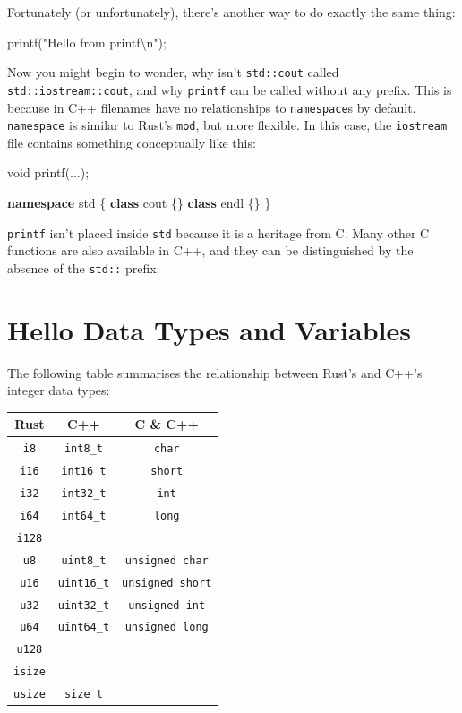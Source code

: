 \documentclass[
]{book}
\newenvironment{Shaded}{\begin{snugshade}}{\end{snugshade}}
\newcommand{\DataTypeTok}[1]{\textcolor[rgb]{0.13,0.29,0.53}{#1}}
\newcommand{\KeywordTok}[1]{\textcolor[rgb]{0.13,0.29,0.53}{\textbf{#1}}}
\newcommand{\NormalTok}[1]{#1}
\newcommand{\SpecialCharTok}[1]{\textcolor[rgb]{0.00,0.00,0.00}{#1}}
\newcommand{\StringTok}[1]{\textcolor[rgb]{0.31,0.60,0.02}{#1}}
\begin{document}
Fortunately (or unfortunately), there's another way to do exactly the same thing:

\begin{Shaded}
\begin{Highlighting}[]
\NormalTok{printf(}\StringTok{"Hello from printf}\SpecialCharTok{\textbackslash{}n}\StringTok{"}\NormalTok{);}
\end{Highlighting}
\end{Shaded}

Now you might begin to wonder, why isn't \texttt{std::cout} called \texttt{std::iostream::cout}, and why \texttt{printf} can be called without any prefix. This is because in C++ filenames have no relationships to \texttt{namespace}s by default. \texttt{namespace} is similar to Rust's \texttt{mod}, but more flexible. In this case, the \texttt{iostream} file contains something conceptually like this:

\begin{Shaded}
\begin{Highlighting}[]
\DataTypeTok{void}\NormalTok{ printf(...);}

\KeywordTok{namespace}\NormalTok{ std \{}
    \KeywordTok{class}\NormalTok{ cout \{\}}
    \KeywordTok{class}\NormalTok{ endl \{\}}
\NormalTok{\}}
\end{Highlighting}
\end{Shaded}

\texttt{printf} isn't placed inside \texttt{std} because it is a heritage from C. Many other C functions are also available in C++, and they can be distinguished by the absence of the \texttt{std::} prefix.

\hypertarget{hello-data-types-and-variables}{%
\section{Hello Data Types and Variables}\label{hello-data-types-and-variables}}

The following table summarises the relationship between Rust's and C++'s integer data types:

\begin{longtable}[]{@{}ccc@{}}
\toprule
Rust & C++ & C \& C++\tabularnewline
\midrule
\endhead
\texttt{i8} & \texttt{int8\_t} & \texttt{char}\tabularnewline
\texttt{i16} & \texttt{int16\_t} & \texttt{short}\tabularnewline
\texttt{i32} & \texttt{int32\_t} & \texttt{int}\tabularnewline
\texttt{i64} & \texttt{int64\_t} & \texttt{long}\tabularnewline
\texttt{i128} & &\tabularnewline
\texttt{u8} & \texttt{uint8\_t} & \texttt{unsigned\ char}\tabularnewline
\texttt{u16} & \texttt{uint16\_t} & \texttt{unsigned\ short}\tabularnewline
\texttt{u32} & \texttt{uint32\_t} & \texttt{unsigned\ int}\tabularnewline
\texttt{u64} & \texttt{uint64\_t} & \texttt{unsigned\ long}\tabularnewline
\texttt{u128} & &\tabularnewline
\texttt{isize} & &\tabularnewline
\texttt{usize} & \texttt{size\_t} &\tabularnewline
\bottomrule
\end{longtable}
\end{document}
